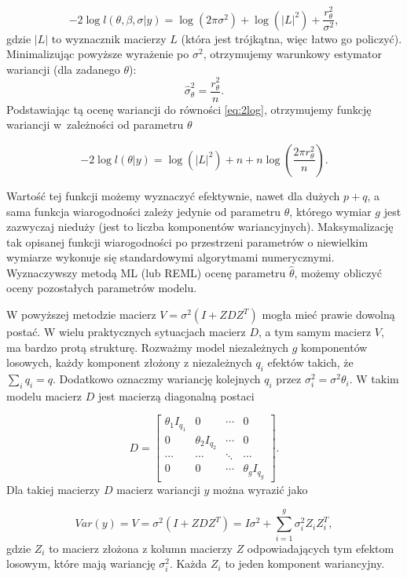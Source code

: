 \documentclass[12pt]{mwbk}
\theoremstyle{plain}
\theoremstyle{definition}
\theoremstyle{definition}
\begin{document}
\begin{equation} \label{eq:2log}
-2\log l(\theta,\beta,\sigma|y)=\log(2\pi \sigma^2)+\log(|L|^2) +\frac{r^2_{\theta}}{\sigma^2}, 
\end{equation}
gdzie $|L|$ to wyznacznik macierzy $L$ (która jest trójkątna, więc łatwo go policzyć). Minimalizując powyższe wyrażenie po $\sigma^2$, otrzymujemy warunkowy estymator wariancji (dla zadanego $\theta$):
$$\hat{\sigma}_{\theta}^2=\frac{r^2_{\theta}}{n}.$$
Podstawiając tą ocenę wariancji do równości \ref{eq:2log}, otrzymujemy funkcję wariancji w~zależności od parametru $\theta$

$$-2 \log l(\theta|y)=\log(|L|^2)+n+n\log\left(\frac{2\pi r^2_{\theta}}{n}\right).$$

Wartość tej funkcji możemy wyznaczyć efektywnie, nawet dla dużych $p+q$, a sama funkcja wiarogodności zależy jedynie od parametru $\theta$, którego wymiar $g$ jest zazwyczaj nieduży (jest to liczba komponentów wariancyjnych). Maksymalizację tak opisanej funkcji wiarogodności po przestrzeni parametrów o niewielkim wymiarze wykonuje się standardowymi algorytmami numerycznymi.
Wyznaczywszy metodą ML (lub REML) ocenę parametru $\hat{\theta}$, możemy obliczyć oceny pozostałych parametrów modelu. 

W powyższej metodzie macierz $V=\sigma^2(I+ZDZ^T)$ mogła mieć prawie dowolną postać. W wielu praktycznych sytuacjach macierz $D$, a tym samym macierz $V$, ma bardzo protą strukturę.
Rozważmy model niezależnych $g$ komponentów losowych, każdy komponent złożony z niezależnych $q_i$ efektów takich, że $\sum\limits_i q_i=q$. Dodatkowo oznaczmy wariancję kolejnych $q_i$ przez $\sigma^2_i=\sigma^2\theta_i$. W takim modelu macierz $D$ jest macierzą diagonalną postaci

$$D=\begin{bmatrix}
\theta_1I_{q_1} & 0 & \cdots & 0 \\
0 & \theta_2I_{q_2} & \cdots & 0 \\
\cdots & \cdots & \ddots & \cdots \\
0 & 0 & \cdots & \theta_gI_{q_g}
\end{bmatrix}.$$
\newpage
\noindent Dla takiej macierzy $D$ macierz wariancji $y$ można wyrazić jako

$$Var(y)=V=\sigma^2(I+ZDZ^T)=I\sigma^2+\sum_{i=1}^{g}\sigma_i^2Z_iZ_i^T,$$
gdzie $Z_i$ to macierz złożona z kolumn macierzy $Z$ odpowiadających tym efektom losowym, które mają wariancję $\sigma^2_i$. Każda $Z_i$ to jeden komponent wariancyjny.
\end{document}
